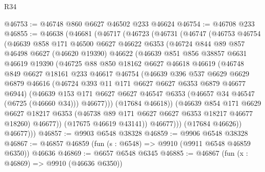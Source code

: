 \begin{lexlean}{R34}
\begin{coremodule}
@46753 := @46748 @860 @6627 @46502 @233 @46624
@46754 := @46708 @233
@46855 := @46638
    (@46681
      (@46717
        (@46723
          (@46731
            (@46747
              (@46753
                @46754
                (@46639
                  @858
                  @171
                  @46500
                  @6627
                  @46622
                  @6353
                  (@46724
                    @844
                    @89
                    @857
                    @46498
                    @6627
                    (@46620 @19390)
                    @46622
                    (@46639
                      @851
                      @856
                      @38857
                      @6631
                      @46619
                      @19390
                      (@46725
                        @88
                        @850
                        @18162
                        @6627
                        @46618
                        @46619
                        (@46748
                          @849
                          @6627
                          @18161
                          @233
                          @46617
                          @46754
                          (@46639
                            @396
                            @537
                            @6629
                            @6629
                            @6879
                            @46616
                            (@46724 @393 @11 @171 @6627 @6627 @6353 @6879 @46677 @6944)
                            (@46639
                              @153
                              @171
                              @6627
                              @6627
                              @46547
                              @6353
                              (@46657 @34 @46547 (@6725 (@46660 @34)))
                              @46677)))
                        (@17684 @46618))
                      (@46639
                        @854
                        @171
                        @6629
                        @6627
                        @18217
                        @6353
                        (@46738 @89 @171 @6627 @6627 @6353 @18217 @46677 @18260)
                        @46677))
                    (@17675 @46619 @43141))
                  @46677)))
            (@17684 @46626))
          @46677)))
@46857 := @9903 @6548 @38328
@46859 := @9906 @6548 @38328
@46867 := @46857 @46859 (fun (s : @6548) => @9910 (@9911 @6548 @46859 @6350)) @46636
@46869 := @6657 @6548 @6345
@46885 := @46867
    (fun (x : @46869) => @9910 (@46636 @6350))

\end{coremodule}
\end{lexlean}
